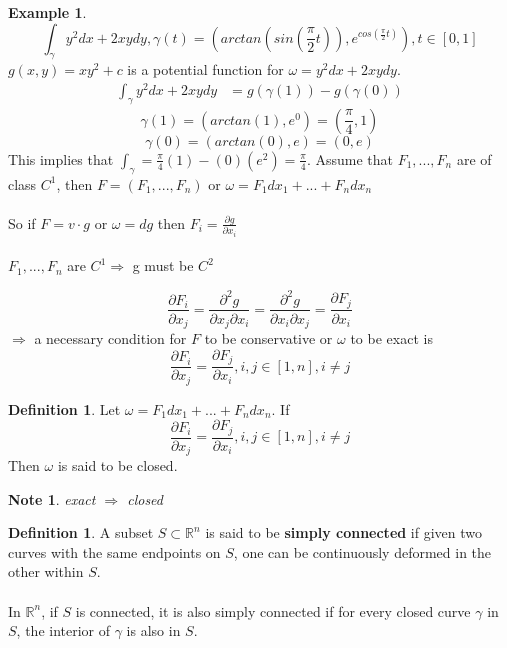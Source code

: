 \documentclass[12pt]{article}
\theoremstyle{plain}
\newtheorem*{note}{Note}
\theoremstyle{definition}
\newtheorem{definition}[theorem]{Definition}
\newtheorem{example}[theorem]{Example}
\begin{document}
\begin{example}
  $$\int_\gamma y^2 dx + 2xydy, \gamma (t) = (arctan(sin(\frac{\pi}{2}t)), e^{cos(\frac{\pi}{2}t)}), t\in [0,1]$$
  $g(x,y) = xy^2 + c$ is a potential function for $\omega = y^2 dx + 2xydy$.
  \\
  \begin{align*}
    \int_\gamma y^2 dx + 2xydy &= g(\gamma (1)) - g(\gamma (0))
  \end{align*}
  $$\gamma (1) = (arctan(1), e^0) = (\frac{\pi}{4}, 1)$$
  $$\gamma (0) = (arctan(0), e) = (0,e)$$
  This implies that $\int_\gamma = \frac{\pi}{4} (1) - (0)(e^2) = \frac{\pi}{4}$. Assume that $F_1,...,F_n $ are of class $C^1$, then $F = (F_1, ..., F_n)$ or $\omega = F_1 dx_1 + ... + F_n dx_n$\\
  \\
  So if $F = v \cdot g$ or $\omega = dg$ then $F_i = \frac{\partial g}{\partial x_i}$\\
  \\
  $F_1,...,F_n$ are $C^1 \Longrightarrow$ g must be $C^2$

  $$\frac{\partial F_i}{\partial x_j} = \frac{\partial^2 g}{\partial x_j \partial x_i} = \frac{\partial^2 g}{\partial x_i\partial x_j} = \frac{\partial F_j}{\partial x_i}$$
  $\Longrightarrow$ a necessary condition for $F$ to be conservative or $\omega$ to be exact is
  $$\frac{\partial F_i}{\partial x_j} = \frac{\partial F_j}{\partial x_i}, i,j \in [1,n], i\neq j$$
\end{example}

\begin{definition}
  Let $\omega = F_1 dx_1 + ... + F_n dx_n$. If
  $$\frac{\partial F_i}{\partial x_j} = \frac{\partial F_j}{\partial x_i}, i,j \in [1,n], i\neq j$$
  Then $\omega$ is said to be closed.
\end{definition}

\begin{note}
    exact $\Longrightarrow$ closed
\end{note}

\begin{definition}
  A subset $S\subset \mathbb{R}^n$ is said to be \textbf{simply connected} if given two curves with the same endpoints on $S$, one can be continuously deformed in the other within $S$.\\
  \\
  In $\mathbb{R}^n$, if $S$ is connected, it is also simply connected if for every closed curve $\gamma$ in $S$, the interior of $\gamma$ is also in $S$.
\end{definition}
\end{document}
